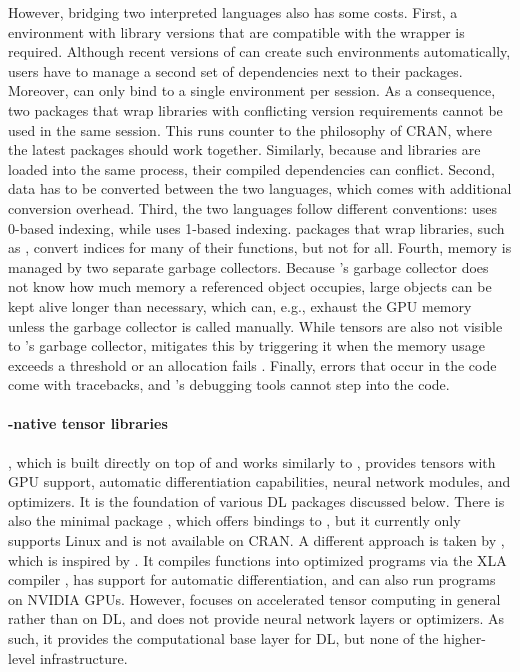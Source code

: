 \documentclass[article,shortnames]{jss}
\theoremstyle{definition}
\begin{document}
However, bridging two interpreted languages also has some costs.
First, a \python{} environment with library versions that are compatible with the \rlang{} wrapper is required.
Although recent versions of  can create such environments automatically, users have to manage a second set of dependencies next to their \rlang{} packages.
Moreover,  can only bind to a single \python{} environment per \rlang{} session.
As a consequence, two \rlang{} packages that wrap \python{} libraries with conflicting version requirements cannot be used in the same session.
This runs counter to the philosophy of CRAN, where the latest \rlang{} packages should work together.
Similarly, because \rlang{} and \python{} libraries are loaded into the same process, their compiled dependencies can conflict.
Second, data has to be converted between the two languages, which comes with additional conversion overhead.
Third, the two languages follow different conventions: \python{} uses 0-based indexing, while \rlang{} uses 1-based indexing.
\rlang{} packages that wrap \python{} libraries, such as , convert indices for many of their functions, but not for all.
Fourth, memory is managed by two separate garbage collectors.
Because \rlang{}'s garbage collector does not know how much memory a referenced \python{} object occupies, large objects can be kept alive longer than necessary, which can, e.g., exhaust the GPU memory unless the garbage collector is called manually.
While \torch{} tensors are also not visible to \rlang{}'s garbage collector, \torch{} mitigates this by triggering it when the memory usage exceeds a threshold or an allocation fails \citep{ref-torch2025}.
Finally, errors that occur in the \python{} code come with \python{} tracebacks, and \rlang{}'s debugging tools cannot step into the \python{} code.

\paragraph{\rlang{}-native tensor libraries}
\torch{}, which is built directly on top of  and works similarly to \pytorch{}, provides tensors with GPU support, automatic differentiation capabilities, neural network modules, and optimizers.
It is the foundation of various DL packages discussed below.
There is also the minimal \rlang{} package , which offers bindings to \libtorch{} \citep{tinytorch}, but it currently only supports Linux and is not available on CRAN.
A different approach is taken by  \citep{ref-anvl}, which is inspired by \jax{}.
It compiles \rlang{} functions into optimized programs via the XLA compiler \citep{ref-openxla}, has support for automatic differentiation, and can also run programs on NVIDIA GPUs.
However,  focuses on accelerated tensor computing in general rather than on DL, and does not provide neural network layers or optimizers.
As such, it provides the computational base layer for DL, but none of the higher-level infrastructure.
\end{document}
